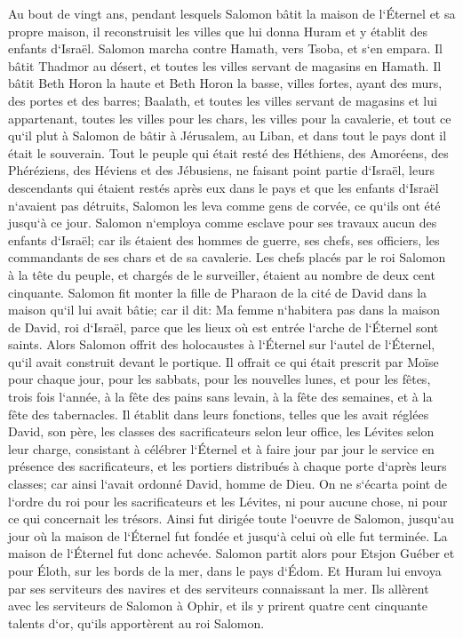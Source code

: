 \verse Au bout de vingt ans, pendant lesquels Salomon bâtit la maison de l`Éternel et sa propre maison, 
\verse il reconstruisit les villes que lui donna Huram et y établit des enfants d`Israël. 
\verse Salomon marcha contre Hamath, vers Tsoba, et s`en empara. 
\verse Il bâtit Thadmor au désert, et toutes les villes servant de magasins en Hamath. 
\verse Il bâtit Beth Horon la haute et Beth Horon la basse, villes fortes, ayant des murs, des portes et des barres; 
\verse Baalath, et toutes les villes servant de magasins et lui appartenant, toutes les villes pour les chars, les villes pour la cavalerie, et tout ce qu`il plut à Salomon de bâtir à Jérusalem, au Liban, et dans tout le pays dont il était le souverain. 
\verse Tout le peuple qui était resté des Héthiens, des Amoréens, des Phéréziens, des Héviens et des Jébusiens, ne faisant point partie d`Israël, 
\verse leurs descendants qui étaient restés après eux dans le pays et que les enfants d`Israël n`avaient pas détruits, Salomon les leva comme gens de corvée, ce qu`ils ont été jusqu`à ce jour. 
\verse Salomon n`employa comme esclave pour ses travaux aucun des enfants d`Israël; car ils étaient des hommes de guerre, ses chefs, ses officiers, les commandants de ses chars et de sa cavalerie. 
\verse Les chefs placés par le roi Salomon à la tête du peuple, et chargés de le surveiller, étaient au nombre de deux cent cinquante. 
\verse Salomon fit monter la fille de Pharaon de la cité de David dans la maison qu`il lui avait bâtie; car il dit: Ma femme n`habitera pas dans la maison de David, roi d`Israël, parce que les lieux où est entrée l`arche de l`Éternel sont saints. 
\verse Alors Salomon offrit des holocaustes à l`Éternel sur l`autel de l`Éternel, qu`il avait construit devant le portique. 
\verse Il offrait ce qui était prescrit par Moïse pour chaque jour, pour les sabbats, pour les nouvelles lunes, et pour les fêtes, trois fois l`année, à la fête des pains sans levain, à la fête des semaines, et à la fête des tabernacles. 
\verse Il établit dans leurs fonctions, telles que les avait réglées David, son père, les classes des sacrificateurs selon leur office, les Lévites selon leur charge, consistant à célébrer l`Éternel et à faire jour par jour le service en présence des sacrificateurs, et les portiers distribués à chaque porte d`après leurs classes; car ainsi l`avait ordonné David, homme de Dieu. 
\verse On ne s`écarta point de l`ordre du roi pour les sacrificateurs et les Lévites, ni pour aucune chose, ni pour ce qui concernait les trésors. 
\verse Ainsi fut dirigée toute l`oeuvre de Salomon, jusqu`au jour où la maison de l`Éternel fut fondée et jusqu`à celui où elle fut terminée. La maison de l`Éternel fut donc achevée. 
\verse Salomon partit alors pour Etsjon Guéber et pour Éloth, sur les bords de la mer, dans le pays d`Édom. 
\verse Et Huram lui envoya par ses serviteurs des navires et des serviteurs connaissant la mer. Ils allèrent avec les serviteurs de Salomon à Ophir, et ils y prirent quatre cent cinquante talents d`or, qu`ils apportèrent au roi Salomon. 

